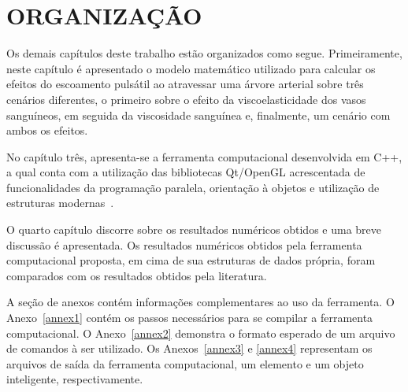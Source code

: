 \section{ORGANIZAÇÃO}\label{sec:org}

Os demais capítulos deste trabalho estão organizados como segue. Primeiramente, neste capítulo é apresentado o modelo matemático utilizado para calcular os efeitos do escoamento pulsátil ao atravessar uma árvore arterial sobre três cenários diferentes, o primeiro sobre o efeito da viscoelasticidade dos vasos sanguíneos, em seguida da viscosidade sanguínea e, finalmente, um cenário com ambos os efeitos.
	
No capítulo três, apresenta-se a ferramenta computacional desenvolvida em C++, a qual conta com a utilização das bibliotecas Qt/OpenGL acrescentada de funcionalidades da programação paralela, orientação à objetos e utilização de estruturas modernas~\cite{factorypattern}.
	
O quarto capítulo discorre sobre os resultados numéricos obtidos e uma breve discussão é apresentada. Os resultados numéricos obtidos pela ferramenta computacional proposta, em cima de sua estruturas de dados própria, foram comparados com os resultados obtidos pela literatura.
	
A seção de anexos contém informações complementares ao uso da ferramenta. O Anexo~\ref{annex1} contém os passos necessários para se compilar a ferramenta computacional. O Anexo~\ref{annex2} demonstra o formato esperado de um arquivo de comandos à ser utilizado. Os Anexos~\ref{annex3} e \ref{annex4} representam os arquivos de saída da ferramenta computacional, um elemento e um objeto inteligente, respectivamente.

